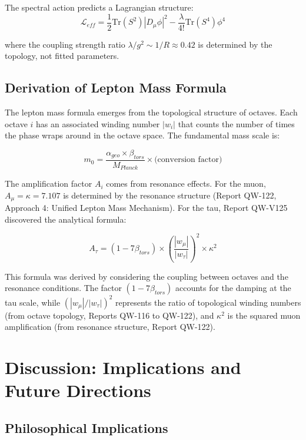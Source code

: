 \documentclass[11pt, a4paper]{article}
\begin{document}
The spectral action predicts a Lagrangian structure:
\begin{equation}
\mathcal{L}_{eff} = \frac{1}{2}\text{Tr}(S^2) |D_\mu\phi|^2 - \frac{\lambda}{4!}\text{Tr}(S^4)\phi^4
\end{equation}

where the coupling strength ratio $\lambda/g^2 \sim 1/R \approx 0.42$ is determined by the topology, not fitted parameters.

\subsection{Derivation of Lepton Mass Formula}

The lepton mass formula emerges from the topological structure of octaves. Each octave $i$ has an associated winding number $|w_i|$ that counts the number of times the phase wraps around in the octave space. The fundamental mass scale is:

\begin{equation}
m_0 = \frac{\alpha_{geo} \times \beta_{tors}}{M_{Planck}} \times \text{(conversion factor)}
\end{equation}

The amplification factor $A_i$ comes from resonance effects. For the muon, $A_\mu = \kappa = 7.107$ is determined by the resonance structure (Report QW-122, Approach 4: Unified Lepton Mass Mechanism). For the tau, Report QW-V125 discovered the analytical formula:

\begin{equation}
A_\tau = (1 - 7\beta_{tors}) \times \left(\frac{|w_\mu|}{|w_\tau|}\right)^2 \times \kappa^2
\end{equation}

This formula was derived by considering the coupling between octaves and the resonance conditions. The factor $(1 - 7\beta_{tors})$ accounts for the damping at the tau scale, while $(|w_\mu|/|w_\tau|)^2$ represents the ratio of topological winding numbers (from octave topology, Reports QW-116 to QW-122), and $\kappa^2$ is the squared muon amplification (from resonance structure, Report QW-122).

\section{Discussion: Implications and Future Directions}

\subsection{Philosophical Implications}
\end{document}
